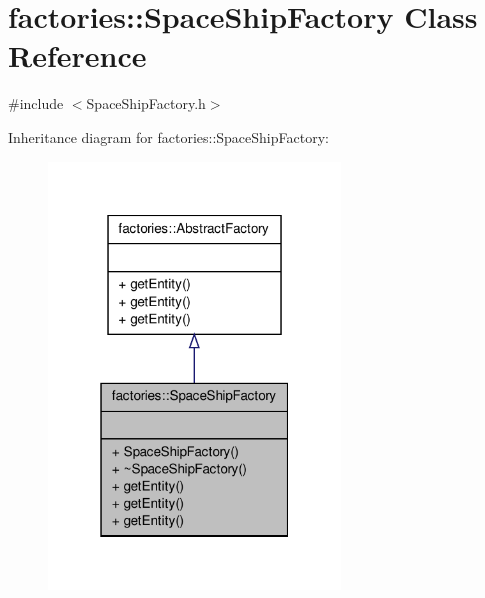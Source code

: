 \hypertarget{classfactories_1_1SpaceShipFactory}{\section{factories\-:\-:\-Space\-Ship\-Factory \-Class \-Reference}
\label{dd/dd6/classfactories_1_1SpaceShipFactory}
}


{\ttfamily \#include $<$\-Space\-Ship\-Factory.\-h$>$}



\-Inheritance diagram for factories\-:\-:\-Space\-Ship\-Factory\-:
\nopagebreak
\begin{figure}[H]
\begin{center}
\leavevmode
\includegraphics[width=220pt]{d3/d18/classfactories_1_1SpaceShipFactory__inherit__graph}
\end{center}
\end{figure}


